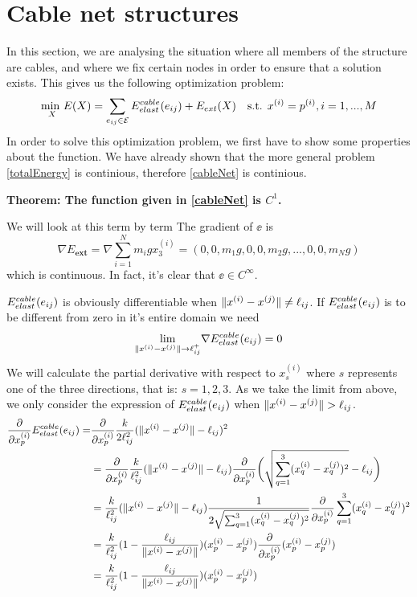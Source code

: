 \section{Cable net structures}
In this section, we are analysing the situation where all members of the structure are cables, and where we fix certain nodes in order to ensure that a solution exists. This gives us the following optimization problem:
\begin{equation}
    \underset{X}{\text{min }} E(X) = \sum\limits_{e_{ij} \in \mathcal{E}} E^{cable}_{elast}(e_{ij}) + E_{ext}(X) \quad \text{s.t. } x^{(i)} = p^{(i)}, i = 1,...,M
    \label{cableNet}
\end{equation}
In order to solve this optimization problem, we first have to show some properties about the function. We have already shown that the more general problem \eqref{totalEnergy} is continious, therefore \eqref{cableNet} is continious.

\textbf{Theorem: The function given in \eqref{cableNet} is $C^1$.}

We will look at this term by term
The gradient of $\ee$ is 
\begin{equation}
    \nabla E_{\textbf{ext}} = \nabla \sum_{i=1}^N m_i g x_3^{(i)}
    = (0,0,m_1 g, 0,0,m_2 g,...,0,0,m_N g)
    \label{gradient_external_force}
\end{equation}
which is continuous. In fact, it's clear that $\ee \in C^{\infty}$.

$E^{cable}_{elast}(e_{ij})$ is obviously differentiable when $\lVert x^{(i)} - x^{(j)}\rVert \neq \ell_{ij}$. If $E^{cable}_{elast}(e_{ij})$ is to be different from zero in it's entire domain we need 
\begin{equation}
    \underset{\lVert x^{(i)} - x^{(j)}\rVert \to \ell_{ij} ^+}{\text{lim}} \nabla E^{cable}_{elast}(e_{ij}) = 0    
\end{equation}
We will calculate the partial derivative with respect to $x_s^{(i)}$ where $s$ represents one of the three directions, that is: $s=1,2,3$. As we take the limit from above, we only consider the expression of $E^{cable}_{elast}(e_{ij})$ when $\lVert x^{(i)} - x^{(j)}\rVert > \ell_{ij}$.
\begin{align}
    \frac{\partial}{\partial x_p^{(i)}} E^{cable}_{elast}(e_{ij}) = &\frac{\partial}{\partial x_p^{(i)}}  \frac{k}{2 \ell_{ij}^2} (\lVert x^{(i)} - x^{(j)}\rVert - \ell_{ij})^2\\ 
    &= \frac{\partial}{\partial x_p^{(i)}}\frac{k}{\ell_{ij}^2}(\lVert x^{(i)} - x^{(j)}\rVert - \ell_{ij}) \frac{\partial}{\partial x_p^{(i)}} \bigg(\sqrt{ \sum_{q=1}^3 (x_q^{(i)}-x_q^{(j)})^2}-\ell_{ij}\bigg)\\&=\frac{k}{\ell_{ij}^2} (\lVert x^{(i)} - x^{(j)}\rVert - \ell_{ij}) \frac{1}{2\sqrt{\sum_{q=1}^3 (x_q^{(i)}-x_q^{(j)})^2}}\frac{\partial}{\partial x_p^{(i)}} \sum_{q=1}^3(x_q^{(i)}-x_q^{(j)})^2\\ &= \frac{k}{\ell_{ij}^2} (1 - \frac{\ell_{ij}}{\lVert x^{(i)} - x^{(j)}\rVert}) (x_p^{(i)} - x_p^{(j)}) \frac{\partial}{\partial x_p^{(i)}} (x_p^{(i)} - x_p^{(j)})\\ &= \frac{k}{\ell_{ij}^2} (1- \frac{\ell_{ij}}{\lVert x^{(i)} - x^{(j)}\rVert}) (x_p^{(i)} - x_p^{(j)})
\end{align}

